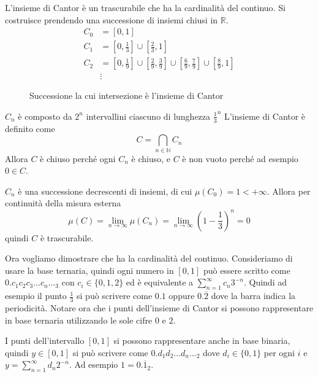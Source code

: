\begin{example}
    L'insieme di Cantor è un trascurabile che ha la cardinalità del continuo.
    Si costruisce prendendo una successione di insiemi chiusi in \(\mathbb{R}\). 
    \begin{align*}
        C_{0} &= [0, 1] \\
        C_{1} &= \left[ 0, \frac{1}{3} \right] \cup \left[ \frac{2}{3}, 1 \right] \\
        C_{2} &= \left[ 0, \frac{1}{9} \right] \cup \left[ \frac{2}{9}, \frac{3}{9} \right] \cup \left[ \frac{6}{9}, \frac{7}{9} \right] \cup \left[ \frac{8}{9}, 1 \right] \\
        &\vdots
    \end{align*}
\begin{figure}[ht]
    \centering
    \caption{Successione la cui intersezione è l'insieme di Cantor}\label{fig:cantor}
\end{figure}
    \(C_{n}\) è composto da \(2^{n}\) intervallini ciascuno di lunghezza
    \(\frac{1}{3}^{n}\) 
    L'insieme di Cantor è definito come
    \[
        C = \bigcap_{n \in \mathbb{N}} C_{n}
    \]
    Allora \(C\) è chiuso perché ogni \(C_{n}\) è chiuso, e \(C\) è non vuoto
    perché ad esempio \(0 \in C\).

    \(C_{n}\) è una successione decrescenti di insiemi, di cui \(\mu(C_{0}) = 1
    < +\infty\). Allora per continuità della misura esterna
    \[
        \mu(C) = \lim_{n \to \infty} \mu(C_{n}) = \lim_{n \to \infty} {\left( 1 -
    \frac{1}{3} \right)}^{n} = 0
    \]
    quindi \(C\) è trascurabile.

    Ora vogliamo dimostrare che ha la cardinalità del continuo. Consideriamo di
    usare la base ternaria, quindi ogni numero in \([0, 1]\) può essere scritto
    come \(0.c_{1}c_{2}c_{3}\dots c_{n}\dots_3\) con \(c_{i}\in \{0, 1, 2\}\) ed è
    equivalente a \(\sum_{n=1}^{\infty} c_n 3^{-n}\). Quindi ad esempio il punto
    \(\frac{1}{3}\) si può scrivere come \(0.1\) oppure \(0.\overline{2}\) dove
    la barra indica la periodicità. Notare ora che i punti dell'insieme di
    Cantor si possono rappresentare in base ternaria utilizzando le sole cifre
    \(0\) e \(2\).

    I punti dell'intervallo \([0, 1]\) si possono rappresentare
    anche in base binaria, quindi \(y \in [0, 1]\) si può scrivere come
    \(0.d_{1}d_{2}\dots d_{n} \dots_2\) dove \(d_{i} \in \{0, 1\}\) per ogni
    \(i\) e \(y = \sum_{n=1}^{\infty} d_{n} 2^{-n} \). Ad esempio \(1 =
    0.\overline{1}_2\).


\end{example}
